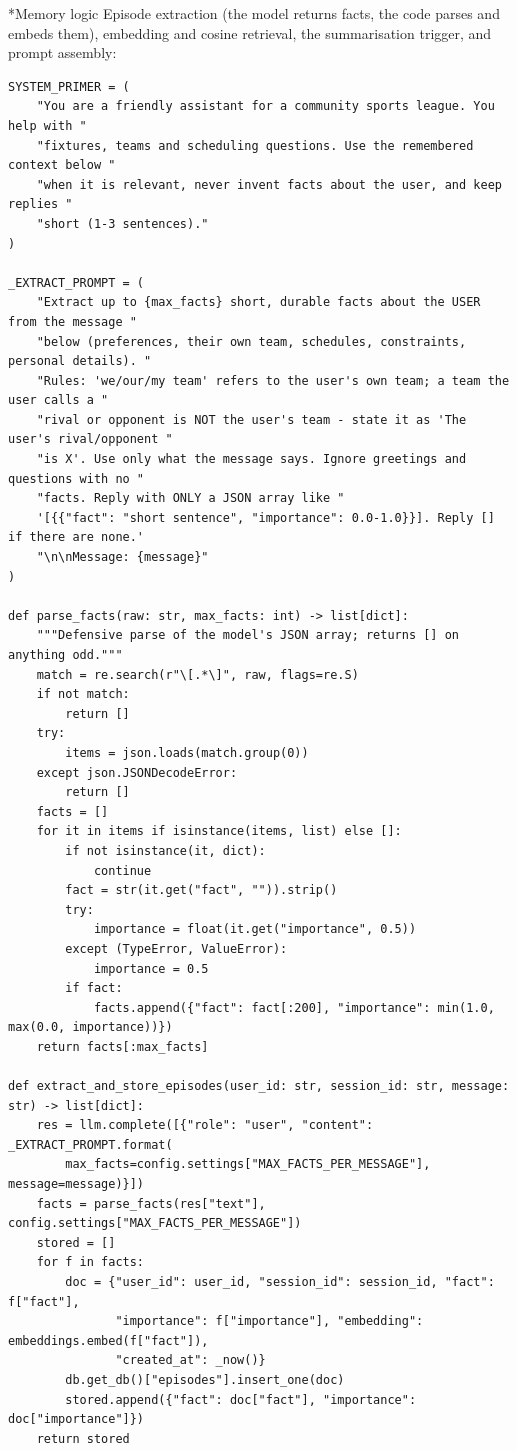 \documentclass[11pt]{article}
\makeatletter
\renewcommand\subsection{\@startsection{subsection}{2}{\z@}{-2.2ex \@plus -1ex \@minus -.2ex}{0.8ex \@plus.2ex}{\normalfont\fontsize{12}{14.5}\selectfont\bfseries}}
\makeatother
\begin{document}
\subsection*{Memory logic}
Episode extraction (the model returns facts, the code parses and embeds them), embedding and cosine retrieval, the summarisation trigger, and prompt assembly:

\begingroup\lstset{basicstyle=\ttfamily\scriptsize}
\begin{lstlisting}
SYSTEM_PRIMER = (
    "You are a friendly assistant for a community sports league. You help with "
    "fixtures, teams and scheduling questions. Use the remembered context below "
    "when it is relevant, never invent facts about the user, and keep replies "
    "short (1-3 sentences)."
)

_EXTRACT_PROMPT = (
    "Extract up to {max_facts} short, durable facts about the USER from the message "
    "below (preferences, their own team, schedules, constraints, personal details). "
    "Rules: 'we/our/my team' refers to the user's own team; a team the user calls a "
    "rival or opponent is NOT the user's team - state it as 'The user's rival/opponent "
    "is X'. Use only what the message says. Ignore greetings and questions with no "
    "facts. Reply with ONLY a JSON array like "
    '[{{"fact": "short sentence", "importance": 0.0-1.0}}]. Reply [] if there are none.'
    "\n\nMessage: {message}"
)

def parse_facts(raw: str, max_facts: int) -> list[dict]:
    """Defensive parse of the model's JSON array; returns [] on anything odd."""
    match = re.search(r"\[.*\]", raw, flags=re.S)
    if not match:
        return []
    try:
        items = json.loads(match.group(0))
    except json.JSONDecodeError:
        return []
    facts = []
    for it in items if isinstance(items, list) else []:
        if not isinstance(it, dict):
            continue
        fact = str(it.get("fact", "")).strip()
        try:
            importance = float(it.get("importance", 0.5))
        except (TypeError, ValueError):
            importance = 0.5
        if fact:
            facts.append({"fact": fact[:200], "importance": min(1.0, max(0.0, importance))})
    return facts[:max_facts]

def extract_and_store_episodes(user_id: str, session_id: str, message: str) -> list[dict]:
    res = llm.complete([{"role": "user", "content": _EXTRACT_PROMPT.format(
        max_facts=config.settings["MAX_FACTS_PER_MESSAGE"], message=message)}])
    facts = parse_facts(res["text"], config.settings["MAX_FACTS_PER_MESSAGE"])
    stored = []
    for f in facts:
        doc = {"user_id": user_id, "session_id": session_id, "fact": f["fact"],
               "importance": f["importance"], "embedding": embeddings.embed(f["fact"]),
               "created_at": _now()}
        db.get_db()["episodes"].insert_one(doc)
        stored.append({"fact": doc["fact"], "importance": doc["importance"]})
    return stored


\end{lstlisting}
\end{document}
